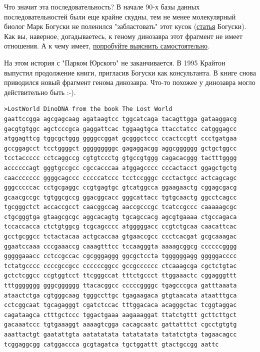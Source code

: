 \documentclass[letterpaper, 11pt]{article}
\begin{document}
Что значит эта последовательность? В начале 90-х базы данных последовательностей были еще крайне скудны, тем не менее молекулярный биолог Марк Богуски не поленился "забластовать" этот кусок (\href{http://markboguski.net/docs/publications/BioTechniques-1992.pdf}{статья} Богуски). Как вы, наверное, догадываетесь, к геному динозавра этот фрагмент не имеет отношения. А к чему имеет, \href{http://blast.ncbi.nlm.nih.gov/Blast.cgi?PROGRAM=blastn&PAGE_TYPE=BlastSearch&LINK_LOC=blasthome}{попробуйте выяснить самостоятельно}.

На этом история с "Парком Юрского" не заканчивается. В 1995 Крайтон выпустил продолжение книги, пригласив Богуски как консультанта. В книге снова приводился новый фрагмент генома динозавра. Что-то похожее у динозавра могло действительно быть :-).

\begin{verbatim}
>LostWorld DinoDNA from the book The Lost World
gaattccgga agcgagcaag agataagtcc tggcatcaga tacagttgga gataaggacg
gacgtgtggc agctcccgca gaggattcac tggaagtgca ttacctatcc catgggagcc
atggagttcg tggcgctggg ggggccggat gcgggctccc ccactccgtt ccctgatgaa
gccggagcct tcctggggct gggggggggc gagaggacgg aggcgggggg gctgctggcc
tcctaccccc cctcaggccg cgtgtccctg gtgccgtggg cagacacggg tactttgggg
accccccagt gggtgccgcc cgccacccaa atggagcccc cccactacct ggagctgctg
caaccccccc ggggcagccc cccccatccc tcctccgggc ccctactgcc actcagcagc
gggcccccac cctgcgaggc ccgtgagtgc gtcatggcca ggaagaactg cggagcgacg
gcaacgccgc tgtggcgccg ggacggcacc gggcattacc tgtgcaactg ggcctcagcc
tgcgggctct accaccgcct caacggccag aaccgcccgc tcatccgccc caaaaagcgc
ctgcgggtga gtaagcgcgc aggcacagtg tgcagccacg agcgtgaaaa ctgccagaca
tccaccacca ctctgtggcg tcgcagcccc atgggggacc ccgtctgcaa caacattcac
gcctgcggcc tctactacaa actgcaccaa gtgaaccgcc ccctcacgat gcgcaaagac
ggaatccaaa cccgaaaccg caaagtttcc tccaagggta aaaagcggcg ccccccgggg
gggggaaacc cctccgccac cgcgggaggg ggcgctccta tggggggagg gggggacccc
tctatgcccc ccccgccgcc ccccccggcc gccgcccccc ctcaaagcga cgctctgtac
gctctcggcc ccgtggtcct ttcgggccat tttctgccct ttggaaactc cggagggttt
tttggggggg gggcgggggg ttacacggcc cccccggggc tgagcccgca gatttaaata
ataactctga cgtgggcaag tgggccttgc tgagaagaca gtgtaacata ataatttgca
cctcggcaat tgcagagggt cgatctccac tttggacaca acagggctac tcggtaggac
cagataagca ctttgctccc tggactgaaa aagaaaggat ttatctgttt gcttcttgct
gacaaatccc tgtgaaaggt aaaagtcgga cacagcaatc gattatttct cgcctgtgtg
aaattactgt gaatattgta aatatatata tatatatata tatatctgta tagaacagcc
tcggaggcgg catggaccca gcgtagatca tgctggattt gtactgccgg aattc
\end{verbatim}
\end{document}
